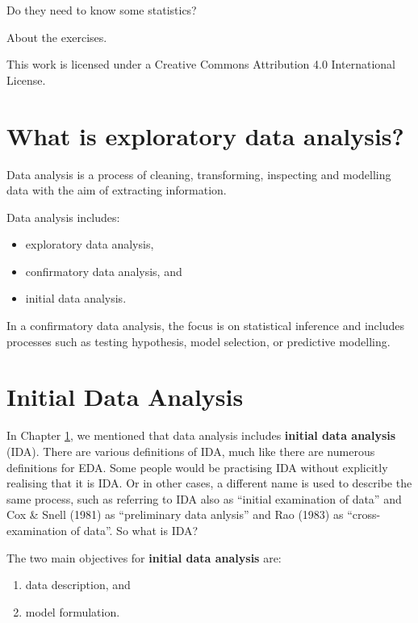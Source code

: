 \documentclass[
]{book}
\providecommand{\tightlist}{%
  \setlength{\itemsep}{0pt}\setlength{\parskip}{0pt}}
\begin{document}
Do they need to know some statistics?

About the exercises.

This work is licensed under a Creative Commons Attribution 4.0 International License.

\hypertarget{what-is-eda}{%
\chapter{What is exploratory data analysis?}\label{what-is-eda}}

Data analysis is a process of cleaning, transforming,
inspecting and modelling data with the aim of extracting
information.

Data analysis includes:

\begin{itemize}
\tightlist
\item
  exploratory data analysis,
\item
  confirmatory data analysis, and
\item
  initial data analysis.
\end{itemize}

In a confirmatory data analysis, the focus is on statistical inference and includes processes such as testing hypothesis, model
selection, or predictive modelling.

\hypertarget{initial-data-analysis}{%
\chapter{Initial Data Analysis}\label{initial-data-analysis}}

In Chapter \ref{what-is-eda}, we mentioned that data analysis includes \textbf{initial data analysis} (IDA). There are various definitions of IDA, much like there are numerous definitions for EDA. Some people would be practising IDA without explicitly realising that it is
IDA. Or in other cases, a different name is used to describe the same
process, such as \citet{Chatfield1985} referring to IDA also as ``initial
examination of data'' and Cox \& Snell (1981) as ``preliminary data
anlysis'' and Rao (1983) as ``cross-examination of data''. So what is IDA?

\begin{aim}
The two main objectives for \textbf{initial data analysis} are:

\begin{enumerate}
\def\labelenumi{\arabic{enumi}.}
\tightlist
\item
  data description, and
\item
  model formulation.
\end{enumerate}
\end{aim}
\end{document}
